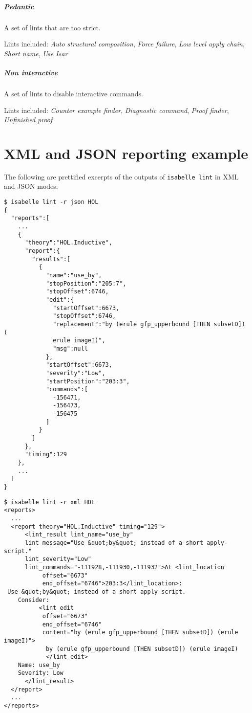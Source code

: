 \paragraph{Pedantic}
A set of lints that are too strict.

Lints included: \textit{Auto structural composition}, \textit{Force failure}, \textit{Low level apply chain}, \textit{Short name}, \textit{Use Isar}


\paragraph{Non interactive}

A set of lints to disable interactive commands.

Lints included: \textit{Counter example finder}, \textit{Diagnostic command}, \textit{Proof finder}, \textit{Unfinished proof}

\chapter{XML and JSON reporting example}\label{app:xml-json}
The following are prettified excerpts of the outputs of \texttt{isabelle lint} in
XML and JSON modes:
\begin{lstlisting}
$ isabelle lint -r json HOL
{
  "reports":[
    ...
    {
      "theory":"HOL.Inductive",
      "report":{
        "results":[
          {
            "name":"use_by",
            "stopPosition":"205:7",
            "stopOffset":6746,
            "edit":{
              "startOffset":6673,
              "stopOffset":6746,
              "replacement":"by (erule gfp_upperbound [THEN subsetD]) (
              erule imageI)",
              "msg":null
            },
            "startOffset":6673,
            "severity":"Low",
            "startPosition":"203:3",
            "commands":[
              -156471,
              -156473,
              -156475
            ]
          }
        ]
      },
      "timing":129
    },
    ...
  ]
}

\end{lstlisting}
\begin{lstlisting}
$ isabelle lint -r xml HOL
<reports>
  ...
  <report theory="HOL.Inductive" timing="129">
      <lint_result lint_name="use_by" 
      lint_message="Use &quot;by&quot; instead of a short apply-script." 
      lint_severity="Low" 
      lint_commands="-111928,-111930,-111932">At <lint_location 
           offset="6673" 
           end_offset="6746">203:3</lint_location>:
 Use &quot;by&quot; instead of a short apply-script.
    Consider: 
          <lint_edit 
           offset="6673" 
           end_offset="6746" 
           content="by (erule gfp_upperbound [THEN subsetD]) (erule imageI)">
            by (erule gfp_upperbound [THEN subsetD]) (erule imageI)
            </lint_edit>
    Name: use_by
    Severity: Low
      </lint_result>
  </report>
  ...
</reports>
\end{lstlisting}